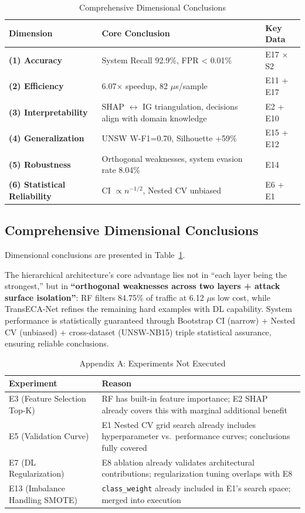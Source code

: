 \documentclass[sigconf]{acmart}
\begin{document}
\begin{table}[!t]
\caption{Comprehensive Dimensional Conclusions}
\label{tab:dimensional_conclusions}
\begin{tabular}{p{3.4cm}p{9.4cm}p{3.0cm}}
\toprule
\textbf{Dimension} & \textbf{Core Conclusion} & \textbf{Key Data} \\
\midrule
\textbf{(1) Accuracy} & System Recall 92.9\%, FPR < 0.01\% & E17 $\times$ S2 \\
\textbf{(2) Efficiency} & 6.07$\times$ speedup, 82 $\mu$s/sample & E11 + E17 \\
\textbf{(3) Interpretability} & SHAP $\leftrightarrow$ IG triangulation, decisions align with domain knowledge & E2 + E10 \\
\textbf{(4) Generalization} & UNSW W-F1=0.70, Silhouette +59\% & E15 + E12 \\
\textbf{(5) Robustness} & Orthogonal weaknesses, system evasion rate 8.04\% & E14 \\
\textbf{(6) Statistical Reliability} & CI $\propto n^{-1/2}$, Nested CV unbiased & E6 + E1 \\
\bottomrule
\end{tabular}
\end{table}

\subsection{Comprehensive Dimensional Conclusions} Dimensional conclusions are presented in Table~\ref{tab:dimensional_conclusions}.

The hierarchical architecture's core advantage lies not in ``each layer being the strongest,'' but in \textbf{``orthogonal weaknesses across two layers + attack surface isolation''}: RF filters 84.75\% of traffic at 6.12 $\mu$s low cost, while TransECA-Net refines the remaining hard examples with DL capability. System performance is statistically guaranteed through Bootstrap CI (narrow) + Nested CV (unbiased) + cross-dataset (UNSW-NB15) triple statistical assurance, ensuring reliable conclusions.

\appendix


\begin{table}[!t]
\caption{Appendix A: Experiments Not Executed}
\label{tab:not_executed}
\small
\begin{tabular}{p{4.4cm}p{11.9cm}}
\toprule
\textbf{Experiment} & \textbf{Reason} \\
\midrule
E3 (Feature Selection Top-K) & RF has built-in feature importance; E2 SHAP already covers this with marginal additional benefit \\
E5 (Validation Curve) & E1 Nested CV grid search already includes hyperparameter vs.\ performance curves; conclusions fully covered \\
E7 (DL Regularization) & E8 ablation already validates architectural contributions; regularization tuning overlaps with E8 \\
E13 (Imbalance Handling SMOTE) & \texttt{class\_weight} already included in E1's search space; merged into execution \\
\bottomrule
\end{tabular}
\end{table}
\end{document}

